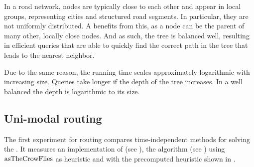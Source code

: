 	In a road network, nodes are typically close to each other and appear in local groups, representing cities and structured
	road segments. In particular, they are not uniformly distributed. A \coverTree benefits from this, as a node can be the
	parent of many other, locally close nodes. And as such, the tree is balanced well, resulting in efficient queries
	that are able to quickly find the correct path in the tree that leads to the nearest neighbor.
	
	Due to the same reason, the running time scales approximately logarithmic with increasing size. Queries take longer if the
	depth of the tree increases. In a well balanced \coverTree the depth is logarithmic to its size.

\subsection{Uni-modal routing}
	The first experiment for \uniModal routing compares time-independent methods for solving the \shortestPathProblem.
	It measures an implementation of \dijkstra (see ), the \astar algorithm (see )
	using $\operatorname{asTheCrowFlies}$ as heuristic and \alt with the precomputed heuristic shown in .
	
